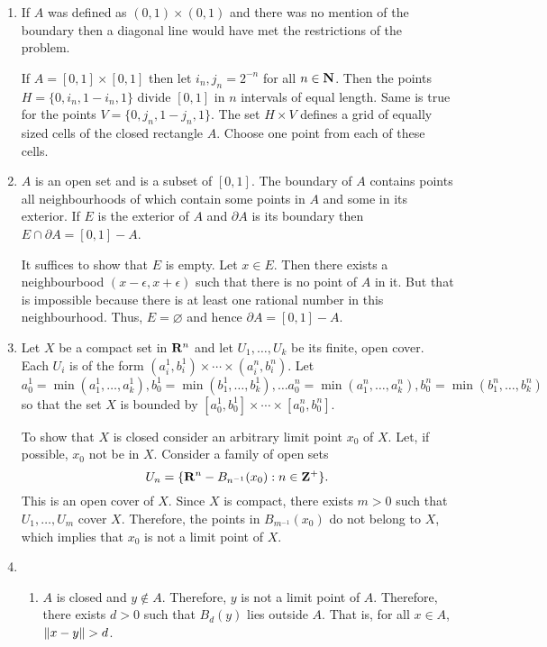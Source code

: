 \begin{enumerate}
\item If $A$ was defined as $(0, 1) \times (0, 1)$ and there was no mention of
the boundary then a diagonal line would have met the restrictions of the 
problem.

If $A = [0, 1] \times [0, 1]$ then let $i_n, j_n = 2^{-n}$ for all $n \in \mathbf{N}$.
Then the points $H=\{0, i_n, 1 - i_n, 1\}$ divide $[0, 1]$ in $n$ intervals of
equal length. Same is true for the points $V = \{0, j_n, 1 - j_n, 1\}$. The
set $H \times V$ defines a grid of equally sized cells of the closed rectangle
 $A$. Choose one point from each of these cells.

\item $A$ is an open set and is a subset of $[0, 1]$. The boundary of $A$
contains points all neighbourhoods of which contain some points in $A$ and
some in its exterior. If $E$ is the exterior of $A$ and $\partial A$ is its
boundary then $E \cap \partial A = [0, 1] - A$.

It suffices to show that $E$ is empty. Let $x \in E$. Then there exists a
neighbourbood $(x - \epsilon, x + \epsilon)$ such that there is no point of
$A$ in it. But that is impossible because there is at least one rational number
in this neighbourhood. Thus, $E = \varnothing$ and hence $\partial A = [0, 1]
- A$.

\item Let $X$ be a compact set in $\mathbf{R}^n$ and let $U_1, \ldots, U_k$ be its
finite, open cover. Each $U_i$ is of the form $(a_i^1, b_i^1) \times \cdots
\times (a_i^n, b_i^n)$. Let $a_0^1 = \min(a_1^1, \ldots, a_k^1), b_0^1 = \min(
b_1^1, \ldots, b_k^1), \ldots a_0^n = \min(a_1^n, \ldots, a_k^n), b_0^n = 
\min(b_1^n, \ldots, b_k^n)$ so that the set $X$ is bounded by $[a_0^1, b_0^1]
\times \cdots \times [a_0^n, b_0^n]$.

To show that $X$ is closed consider an arbitrary limit point $x_0$ of $X$. Let,
if possible, $x_0$ not be in $X$. Consider a family of open sets
\[
U_n = \{\mathbf{R}^n - B_{n^{-1}}(x_0) : n \in \mathbf{Z}^+\}.
\]
This is an open cover of $X$. Since $X$ is compact, there exists $m > 0$ such
that $U_1, \ldots, U_m$ cover $X$. Therefore, the points in $B_{m^{-1}}(x_0)$
do not belong to $X$, which implies that $x_0$ is not a limit point of $X$.

\item
\begin{enumerate}
\item $A$ is closed and $y \notin A$. Therefore, $y$ is not a limit point of 
$A$. Therefore, there exists $d > 0$ such that $B_d(y)$ lies outside $A$. 
That is, for all $x \in A$, $\left\Vert{x - y}\right\Vert > d$.


\end{enumerate}
\end{enumerate}
